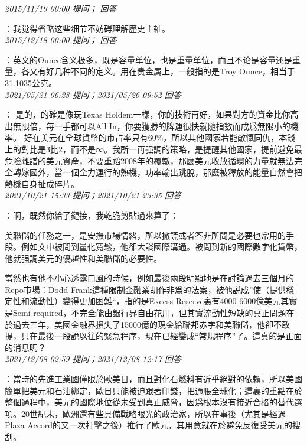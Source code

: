 \documentclass[twocolumn]{ctexart}
\begin{document}
\textit{\hfill\noindent\small 2015/11/19 00:00 提问； 回答}

：我觉得省略这些细节不妨碍理解歷史主轴。\\

\textit{\hfill\noindent\small 2015/12/18 00:00 提问； 回答}

：英文的Ounce含义极多，既是容量单位，也是重量单位，而且不论是容量还是重量，各又有好几种不同的定义。用在贵金属上，一般指的是Troy Ounce，相当于31.1035公克。\\

\textit{\hfill\noindent\small 2021/05/21 06:28 提问；2021/05/26 09:52 回答}

：
是的，的確是像玩Texas Holdem一樣，你的技術再好，如果對方的資金比你高出無限倍，每一手都可以All In，你要獲勝的牌運很快就隨指數而成爲無限小的機率。
好在美元在全球貨幣的市占率只有60\%，所以其他國家若能敵愾同仇，本錢上的對比是3比2，而不是∞。我所一再强調的策略，是提醒其他國家，提前避免最危險離譜的美元資產，不要重蹈2008年的覆轍，那麽美元收放循環的力量就無法完全轉嫁國外，當一個全力運行的熱機，功率輸出跳脫，那麽被釋放的能量自然會把熱機自身扯成碎片。
\\

\textit{\hfill\noindent\small 2021/10/21 15:33 提问；2021/10/21 23:35 回答}

：啊，既然你給了鏈接，我乾脆剪貼過來算了：

美聯儲的任務之一，是安撫市場情緒，所以撒謊或者答非所問是必要也常用的手段。例如文中被問到量化寬鬆，他卻大談國際溝通。被問到新的國際數字化貨幣，他就强調美元的優越性和美聯儲的必要性。

當然也有他不小心透露口風的時候，例如最後兩段明顯地是在討論過去三個月的Repo市場：Dodd-Frank這種限制金融業胡作非爲的法案，被他説成”使（提供穩定性和流動性）變得更加困難“，指的是Excess Reserve裏有4000-6000億美元其實是Semi-required，不完全能由銀行界自由花用，但其實流動性短缺的真正問題在於過去三年，美國金融界損失了15000億的現金給聯邦赤字和美聯儲，他卻不敢提，只在最後一段說以往的緊急程序，現在已經變成“常規程序”了。這真的是正面的消息嗎？
\\

\textit{\hfill\noindent\small 2021/12/08 02:59 提问；2021/12/08 12:17 回答}

：當時的先進工業國僅限於歐美日，而且對化石燃料有近乎絕對的依賴，所以美國簡單把美元和石油綁定，歐日只能被迫跟著印錢，把通脹全球化；這裏的重點在於整個過程中，美元的國際地位從未受到真正威脅，因爲根本沒有接近合格的替代選項。20世紀末，歐洲還有些具備戰略眼光的政治家，所以在事後（尤其是經過Plaza Accord的又一次打擊之後）推行了歐元，其用意就在於避免反復受美元的搜刮。
\end{document}
